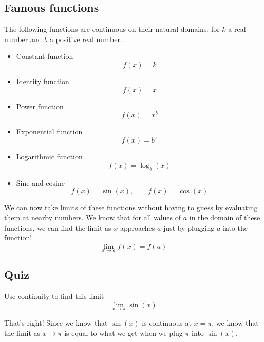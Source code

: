 \documentclass{ximera}
\begin{document}
\subsection{Famous functions}

\begin{theorem}
    The following functions are continuous on their natural domains, for $k$ a real number and $b$ a positive real number.
    \begin{itemize}
        \item Constant function \[f(x)=k\]
        \item Identity function \[f(x)=x\]
        \item Power function \[f(x)=x^b\]
        \item Exponential function \[f(x)=b^x\]
        \item Logarithmic function \[f(x)=\log_b(x)\]
        \item Sine and cosine \[f(x)=\sin(x), \qquad f(x) = \cos(x)\]
    \end{itemize}
\end{theorem}

We can now take limits of these functions without having to guess by evaluating them at nearby numbers. We know that for all values of $a$ in the domain of these functions, we can find the limit as $x$ approaches $a$ just by plugging $a$ into the function!
\[
    \lim_{x \to a} f(x) = f(a)
\]

\subsection{Quiz}

\begin{question}
Use continuity to find this limit \[ \lim_{x \to \pi} \sin(x) \]
\begin{multipleChoice}  
\end{multipleChoice}  

\begin{explanation}
    That's right! Since we know that $\sin(x)$ is continuous at $x = \pi$, we know that the limit as $x \to \pi$ is equal to what we get when we plug $\pi$ into $\sin(x)$.
\end{explanation}
\end{question}
\end{document}
